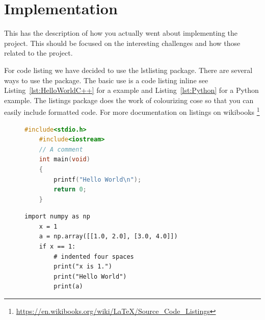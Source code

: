 \chapter{Implementation}
\label{chap:implementation}
This has the description of how you actually went about implementing the project.  This should be focused on the interesting challenges and how those related to the project.



For code listing we have decided to use the lstlisting package. There are several ways to use the package.  The basic use is a code listing inline see Listing~\ref{lst:HelloWorldC++} for a \CPP example and Listing~\ref{lst:Python} for a Python example. The listings package does the work of colourizing cose so that you can easily include formatted code.   For more documentation on listings on wikibooks \footnote{\url{https://en.wikibooks.org/wiki/LaTeX/Source_Code_Listings}}

\lstset{frameround=tttt}
\lstset{frame=single}
\lstset{xleftmargin=.05\textwidth, xrightmargin=.05\textwidth}



\begin{figure}
\begin{lstlisting}[language=C++, caption= {Hello World C++ The code listing for Hello World in C++, with colour syntax highlighting.}, label={lst:HelloWorldC++}]
    #include<stdio.h>
    #include<iostream>
    // A comment
    int main(void)
    {
        printf("Hello World\n");
        return 0;
    }
\end{lstlisting}
\end{figure}

\begin{figure}
\lstset{language=Python}
\begin{lstlisting}[caption = {The code listing for a Python increment a matrix example}, label={lst:Python}]
    import numpy as np
    x = 1
    a = np.array([[1.0, 2.0], [3.0, 4.0]])
    if x == 1:
        # indented four spaces
        print("x is 1.")
        print("Hello World")
        print(a)
\end{lstlisting}
\end{figure}


